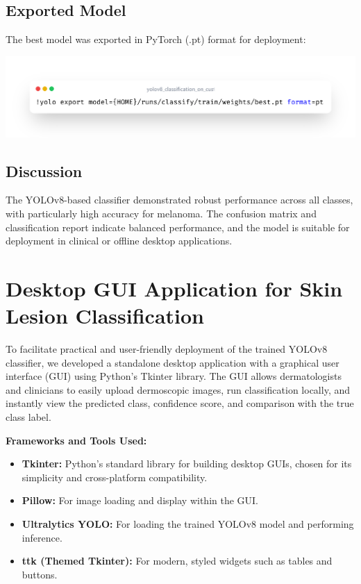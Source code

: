 \documentclass[a4paper,12pt]{report}
\begin{document}
\begin{spacing}{1.5}
    \subsection*{Exported Model}
    The best model was exported in PyTorch (.pt) format for deployment:
    \begin{center}
        \includegraphics[width=\textwidth]{code/export.png}
    \end{center}

    \subsection*{Discussion}
    The YOLOv8-based classifier demonstrated robust performance across all classes, with particularly high accuracy for melanoma. The confusion matrix and classification report indicate balanced performance, and the model is suitable for deployment in clinical or offline desktop applications.


\newpage

    \section{Desktop GUI Application for Skin Lesion Classification}

    To facilitate practical and user-friendly deployment of the trained YOLOv8 classifier, we developed a standalone desktop application with a graphical user interface (GUI) using Python's Tkinter library. The GUI allows dermatologists and clinicians to easily upload dermoscopic images, run classification locally, and instantly view the predicted class, confidence score, and comparison with the true class label.
    
    \textbf{Frameworks and Tools Used:}
    \begin{itemize}
        \item \textbf{Tkinter:} Python's standard library for building desktop GUIs, chosen for its simplicity and cross-platform compatibility.
        \item \textbf{Pillow:} For image loading and display within the GUI.
        \item \textbf{Ultralytics YOLO:} For loading the trained YOLOv8 model and performing inference.
        \item \textbf{ttk (Themed Tkinter):} For modern, styled widgets such as tables and buttons.
    \end{itemize}
    

\end{spacing}
\end{document}
